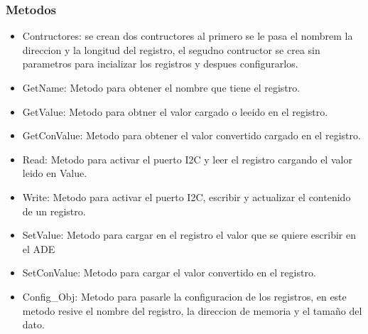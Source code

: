             \subsubsection{Metodos}
                \begin{itemize}
                    \item Contructores: se crean dos contructores al primero se le pasa el nombrem la direccion y la longitud del registro, el segudno contructor se crea sin parametros para incializar los registros y despues configurarlos.
                    \item GetName: Metodo para obtener el nombre que tiene el registro.
                    \item GetValue: Metodo para obtner el valor cargado o leeido en el registro.
                    \item GetConValue: Metodo para obtener el valor convertido cargado en el registro.
                    \item Read: Metodo para activar el puerto I2C y leer el registro cargando el valor leido en Value.
                    \item Write: Metodo para activar el puerto I2C, escribir y actualizar el contenido de un registro.
                    \item SetValue: Metodo para cargar en el registro el valor que se quiere escribir en el ADE
                    \item SetConValue: Metodo para cargar el valor convertido en el registro.
                    \item Config\_Obj: Metodo para pasarle la configuracion de los registros, en este metodo resive el nombre del registro, la direccion de memoria y el tamaño del dato.
                \end{itemize}
            
